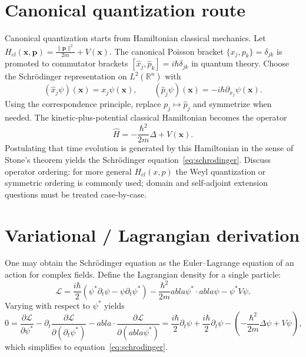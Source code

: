 \documentclass[11pt]{article}
\begin{document}
\section{Canonical quantization route}
Canonical quantization starts from Hamiltonian classical mechanics.  Let $H_{cl}(\mathbf{x},\mathbf{p})=\frac{\|\mathbf{p}\|^2}{2m}+V(\mathbf{x})$.  The canonical Poisson bracket $\{x_j,p_k\}=\delta_{jk}$ is promoted to commutator brackets $[\hat x_j,\hat p_k]=i\hbar\delta_{jk}$ in quantum theory.  Choose the Schr\"odinger representation on $L^2(\mathbb{R}^n)$ with
\begin{equation}
(\hat x_j\psi)(\mathbf{x})=x_j\psi(\mathbf{x}),\qquad(\hat p_j\psi)(\mathbf{x})=-i\hbar\partial_{x_j}\psi(\mathbf{x}).
\end{equation}
Using the correspondence principle, replace $p_j\mapsto\hat p_j$ and symmetrize when needed.  The kinetic-plus-potential classical Hamiltonian becomes the operator
\begin{equation}
\hat H=-\frac{\hbar^2}{2m}\Delta+V(\mathbf{x}).
\end{equation}
Postulating that time evolution is generated by this Hamiltonian in the sense of Stone's theorem yields the Schr\"odinger equation~\eqref{eq:schrodinger}.  Discuss operator ordering: for more general $H_{cl}(x,p)$ the Weyl quantization or symmetric ordering is commonly used; domain and self-adjoint extension questions must be treated case-by-case.

\section{Variational / Lagrangian derivation}
One may obtain the Schr\"odinger equation as the Euler--Lagrange equation of an action for complex fields.  Define the Lagrangian density for a single particle:
\begin{equation}
\mathcal{L}=\frac{i\hbar}{2}\left(\psi^*\partial_t\psi-\psi\partial_t\psi^*\right)-\frac{\hbar^2}{2m}
abla\psi^*\cdot
abla\psi-\psi^*V\psi.
\end{equation}
Varying with respect to $\psi^*$ yields
\begin{equation}
0=\frac{\partial\mathcal{L}}{\partial\psi^*}-\partial_t\frac{\partial\mathcal{L}}{\partial(\partial_t\psi^*)}-
abla\cdot\frac{\partial\mathcal{L}}{\partial(
abla\psi^*)}
=\frac{i\hbar}{2}\partial_t\psi+\frac{i\hbar}{2}\partial_t\psi-\left(-\frac{\hbar^2}{2m}\Delta\psi+V\psi\right),
\end{equation}
which simplifies to equation~\eqref{eq:schrodinger}.
\end{document}
